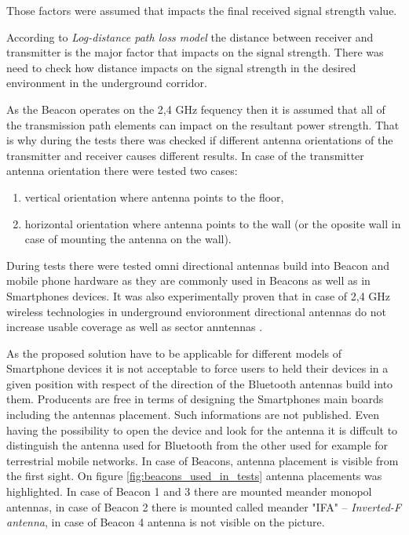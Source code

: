 \documentclass[../main.tex]{subfiles}
\begin{document}
Those factors were assumed that impacts the final received signal strength value.

According to \textit{Log-distance path loss model} \cite{RSSI_path_loss_prediction_model} the distance between receiver and transmitter is the major factor that impacts on the signal strength. There was need to check how distance impacts on the signal strength in the desired environment in the underground corridor.

As the Beacon operates on the 2,4 GHz fequency then it is assumed that all of the transmission path elements can impact on the resultant power strength. That is why during the tests there was checked if different antenna orientations of the transmitter and  receiver causes different results. In case of the transmitter antenna orientation there were tested two cases:
\begin{enumerate}
	\item vertical orientation where antenna points to the floor,
	\item horizontal orientation where antenna points to the wall (or the oposite wall in case of mounting the antenna on the wall).
\end{enumerate}

During tests there were tested omni directional antennas build into Beacon and mobile phone hardware as they are commonly used in Beacons as well as in Smartphones devices. It was also experimentally proven that in case of 2,4 GHz wireless technologies in underground envioronment directional antennas do not increase usable coverage as well as sector anntennas \cite{Thesis_CM}.

As the proposed solution have to be applicable for different models of Smartphone devices it is not acceptable to force users to held their devices in a given position with respect of the direction of the Bluetooth antennas build into them. Producents are free in terms of designing the Smartphones main boards including the antennas placement. Such informations are not published. Even having the possibility to open the device and look for the antenna it is diffcult to distinguish the antenna used for Bluetooth from the other used for example for terrestrial mobile networks. In case of Beacons, antenna placement is visible from the first sight. On figure \ref{fig:beacons_used_in_tests} antenna placements was highlighted. In case of Beacon 1 and 3 there are mounted meander monopol antennas, in case of Beacon 2 there is mounted called meander "IFA" -- \textit{Inverted-F antenna}, in case of Beacon 4 antenna is not visible on the picture.
\end{document}
